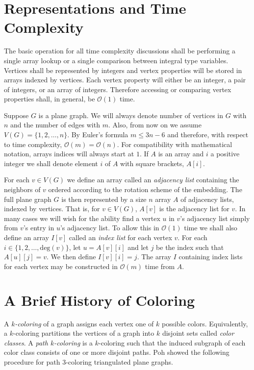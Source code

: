 \documentclass[letterpaper, 12pt]{amsart}
\theoremstyle{definition}
\theoremstyle{definition}
\theoremstyle{thm}
\theoremstyle{definition}
\begin{document}
\section{Representations and Time Complexity}

The basic operation for all time complexity discussions shall be
performing a single array lookup or a single comparison between integral type
variables. Vertices shall be represented by integers and vertex properties will
be stored in arrays indexed by vertices. Each vertex property will either
be an integer, a pair of integers, or an array of integers. Therefore accessing
or comparing vertex properties shall, in general, be $\mathcal{O}(1)$ time.

Suppose $G$ is a plane graph. We will always denote number of vertices in $G$
with $n$ and the number of edges with $m$. Also, from now on we assume
$V(G)=\{1,2,\ldots,n\}$. By Euler's formula $m\le 3n-6$ and therefore, with
respect to time complexity, $\mathcal{O}(m)=\mathcal{O}(n)$. For compatibility
with mathematical notation, arrays indices will always start at $1$. If $A$ is
an array and $i$ a positive integer we shall denote element $i$ of $A$ with
square brackets, $A[i]$.


For each $v\in V(G)$ we define an array called an
\emph{adjacency list} containing the neighbors of $v$ ordered according to
the rotation scheme of the embedding. The full plane graph $G$ is then
represented by a size $n$ array $A$ of adjacency lists, indexed by vertices.
That is, for $v\in V(G)$, $A[v]$ is the adjacency list for $v$. In many cases we
will wish for the ability find a vertex $u$ in $v$'s adjacency list simply from
$v$'s entry in $u$'s adjacency list. To allow this in $\mathcal{O}(1)$ time we
shall also define an array $I[v]$ called an \emph{index list} for each vertex
$v$. For each $i\in\{1,2,\ldots,\text{deg}(v)\}$, let $u=A[v][i]$ and let $j$ be
the index such that $A[u][j]=v$. We then define $I[v][i]=j$. The array $I$
containing index lists for each vertex may be constructed in $\mathcal{O}(m)$
time from $A$.

\section{A Brief History of Coloring}

A $k$\textit{-coloring} of a graph assigns each vertex one of $k$ possible
colors. Equivalently, a $k$-coloring partitions the vertices of a graph into $k$
disjoint sets called \textit{color classes}. A \textit{path $k$-coloring} is
a $k$-coloring such that the induced subgraph of each color class consists of
one or more disjoint paths. Poh \cite{poh} showed the following procedure for
path $3$-coloring triangulated plane graphs.
\end{document}
